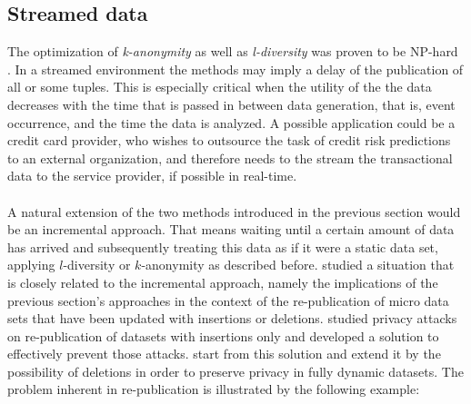 \subsection{Streamed data}
The optimization of \textit{k-anonymity} as well as \textit{l-diversity} was proven to be NP-hard \cite{kanonymitynphard, ldiversitynphard}. In a streamed environment the methods may imply a delay of the publication of all or some tuples. This is especially critical when the utility of the the data decreases with the time that is passed in between data generation, that is, event occurrence, and the time the data is analyzed. A possible application could be a credit card provider, who wishes to outsource the task of credit risk predictions to an external organization, and therefore needs to the stream the transactional data to the service provider, if possible in real-time.\\
\\
A natural extension of the two methods introduced in the previous section would be an incremental approach. That means waiting until a certain amount of data has arrived and subsequently treating this data as if it were a static data set, applying $l$-diversity or $k$-anonymity as described before.  studied a situation that is closely related to the incremental approach, namely the implications of the previous section's approaches in the context of the re-publication of micro data sets that have been updated with insertions or deletions.  studied privacy attacks on re-publication of datasets with insertions only and developed a solution to effectively prevent those attacks.  start from this solution and extend it by the possibility of deletions in order to preserve privacy in fully dynamic datasets. The problem inherent in re-publication is illustrated by the following example:

